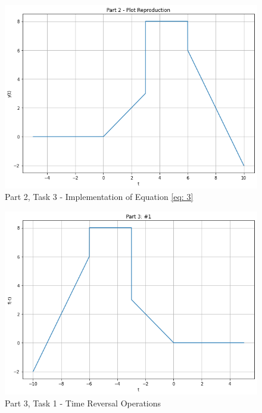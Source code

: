 \documentclass[12pt]{report}
\begin{document}
\begin{figure}[h!]
  \centering
  \includegraphics[scale=0.5]{p2t3.png}
  \caption{Part 2, Task 3 - Implementation of Equation \eqref{eq: 3}}
  \label{fig: p2t3}
\end{figure}
\begin{figure}[h!]
  \centering
  \includegraphics[scale=0.5]{p3t1.png}
  \caption{Part 3, Task 1 - Time Reversal Operations}
  \label{fig: p3t1}
\end{figure}
\end{document}

